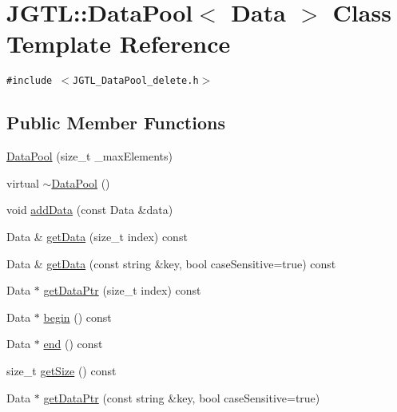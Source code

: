 \hypertarget{class_j_g_t_l_1_1_data_pool}{
\section{JGTL::Data\-Pool$<$ Data $>$ Class Template Reference}
\label{class_j_g_t_l_1_1_data_pool}
}
{\tt \#include $<$JGTL\_\-Data\-Pool\_\-delete.h$>$}

\subsection*{Public Member Functions}
\begin{CompactItemize}
\item 
\hyperlink{class_j_g_t_l_1_1_data_pool_31db1e354783d6464e3ee91f6844a115}{Data\-Pool} (size\_\-t \_\-max\-Elements)
\item 
virtual \hyperlink{class_j_g_t_l_1_1_data_pool_11db34789e06fa0adf25c904e7797242}{$\sim$Data\-Pool} ()
\item 
void \hyperlink{class_j_g_t_l_1_1_data_pool_8a1ee540cad394f557250cf68d1a54d5}{add\-Data} (const Data \&data)
\item 
Data \& \hyperlink{class_j_g_t_l_1_1_data_pool_6724b45cf27d9c1031dbbcc83bc0e24e}{get\-Data} (size\_\-t index) const
\item 
Data \& \hyperlink{class_j_g_t_l_1_1_data_pool_b45c619a2a490bc75cb3f558eb385210}{get\-Data} (const string \&key, bool case\-Sensitive=true) const 
\item 
Data $\ast$ \hyperlink{class_j_g_t_l_1_1_data_pool_f4d1d2be96611b56b379ae8df2805f60}{get\-Data\-Ptr} (size\_\-t index) const
\item 
Data $\ast$ \hyperlink{class_j_g_t_l_1_1_data_pool_a7705ab185a03a9637f7706a8e91b7d8}{begin} () const
\item 
Data $\ast$ \hyperlink{class_j_g_t_l_1_1_data_pool_4161e2ff9fe92083b6541ba6a007254b}{end} () const
\item 
size\_\-t \hyperlink{class_j_g_t_l_1_1_data_pool_2a36203564f65a695c1ed9cae869f379}{get\-Size} () const
\item 
Data $\ast$ \hyperlink{class_j_g_t_l_1_1_data_pool_324ce69513e59869e37f94c67285307f}{get\-Data\-Ptr} (const string \&key, bool case\-Sensitive=true)
\end{CompactItemize}
